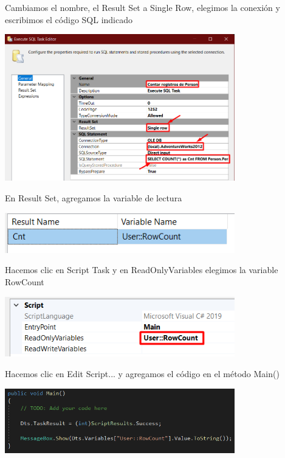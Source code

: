\documentclass[12pt,letterpaper]{article}
\begin{document}
Cambiamos el nombre, el Result Set a Single Row, elegimos la conexión y escribimos el código SQL indicado

\begin{center}
    \includegraphics[width=10cm]{./img/img34.png}
\end{center}

En Result Set, agregamos la variable de lectura

\begin{center}
    \includegraphics[width=10cm]{./img/img35.png}
\end{center}

Hacemos clic en Script Task y en ReadOnlyVariables elegimos la variable RowCount

\begin{center}
    \includegraphics[width=10cm]{./img/img36.png}
\end{center}

Hacemos clic en Edit Script... y agregamos el código en el método Main()

\begin{center}
    \includegraphics[width=10cm]{./img/img37.png}
\end{center}
\end{document}
